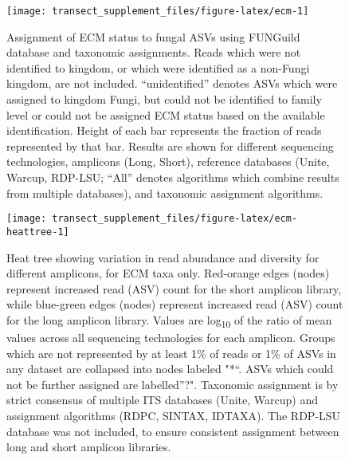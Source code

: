 \documentclass[
]{article}
\begin{document}
\begin{figure}

{\centering \texttt{[image: transect\_supplement\_files/figure-latex/ecm-1]} 

}

\caption[Assignment of ECM status to fungal ASVs using FUNGuild database and taxonomic assignments]{Assignment of ECM status to fungal ASVs using FUNGuild database and taxonomic assignments. Reads which were not identified to kingdom, or which were identified as a non-Fungi kingdom, are not included.
``unidentified'' denotes ASVs which were assigned to kingdom Fungi, but could not be identified to family level or could not be assigned ECM status based on the available identification.
Height of each bar represents the fraction of reads represented by that bar.
Results are shown for different sequencing technologies, amplicons (Long, Short), reference databases (Unite, Warcup, RDP-LSU; ``All'' denotes algorithms which combine results from multiple databases), and taxonomic assignment algorithms.}\label{fig:ecm}
\end{figure}










\begin{figure}

{\centering \texttt{[image: transect\_supplement\_files/figure-latex/ecm-heattree-1]} 

}

\caption[Heat tree showing variation in read abundance and diversity for different amplicons, for ECM taxa only]{Heat tree showing variation in read abundance and diversity for different amplicons, for ECM taxa only. Red-orange edges (nodes) represent increased read (ASV) count for the short amplicon library, while blue-green edges (nodes) represent increased read (ASV) count for the long amplicon library.
Values are log\textsubscript{10} of the ratio of mean values across all sequencing technologies for each amplicon.
Groups which are not represented by at least 1\% of reads or 1\% of ASVs in any dataset are collapsed into nodes labeled "*``.
ASVs which could not be further assigned are labelled''?".
Taxonomic assignment is by strict consensus of multiple ITS databases (Unite, Warcup) and assignment algorithms (RDPC, SINTAX, IDTAXA).
The RDP-LSU database was not included, to ensure consistent assignment between long and short amplicon libraries.}\label{fig:ecm-heattree}
\end{figure}
\end{document}
